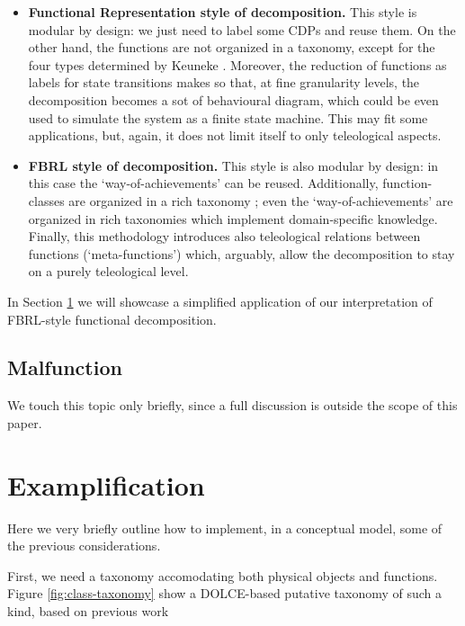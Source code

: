 \documentclass[
]{ceurart}
\begin{document}
\begin{itemize}
  \item \textbf{Functional Representation style of decomposition.} This style is modular by design: we just need to label some CDPs and reuse them. On the other hand, the functions are not organized in a taxonomy, except for the four types determined by Keuneke \cite{keuneke_device_1991}. Moreover, the reduction of functions as labels for state transitions makes so that, at fine granularity levels, the decomposition becomes a sot of behavioural diagram, which could be even used to simulate the system as a finite state machine. This may fit some applications, but, again, it does not limit itself to only teleological aspects.
  \item \textbf{FBRL style of decomposition.} This style is also modular by design: in this case the `way-of-achievements' can be reused. Additionally, function-classes are organized in a rich taxonomy ; even the `way-of-achievements' are organized in rich taxonomies which implement domain-specific knowledge. Finally, this methodology introduces also teleological relations between functions (`meta-functions') which, arguably, allow the decomposition to stay on a purely teleological level. 
\end{itemize}
In Section \ref{sec:use-case} we will showcase a simplified application of our interpretation of FBRL-style functional decomposition.

\subsection{Malfunction}
We touch this topic only briefly, since a full discussion is outside the scope of this paper.

\section{Examplification}\label{sec:use-case}

Here we very briefly outline how to implement, in a conceptual model, some of the previous considerations.

First, we need a taxonomy accomodating both physical objects and functions. Figure \ref{fig:class-taxonomy} show a DOLCE-based \cite{masoloWonderWebDeliverableD182003} putative taxonomy of such a kind, based on previous work  
\end{document}
